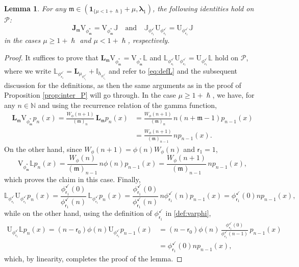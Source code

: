 \documentclass[JEP,XML,SOM,Unicode]{cedram}
\theoremstyle{plain}
\newtheorem{lemma}[theorem]{Lemma}
\theoremstyle{definition}
\newcommand{\N}{\mathbb{N}}
\newcommand{\Poly}{\mathscr{P}}
\newcommand{\calI}{\mathds{I}}
\newcommand{\calL}{\mathds{L}}
\newcommand{\calLd}{\mathbf{L}}
\newcommand{\calJ}{\mathds{J}}
\newcommand{\calJd}{\mathbf{J}}
\newcommand{\m}{\mathfrak{m}}
\newcommand{\lam}{{\bm{\lambda}_1}}
\newcommand{\tet}{{\mathsf{r}_0}}
\newcommand{\vat}{{\mathsf{r}_1}}
\newcommand{\phm}{{\phi_\m^*}}
\renewcommand{\varphi}{{\phi_{\vat}^{\checkmark}}}
\let\h\hslash
\let\mo\mu
\begin{document}
\begin{lemma}
\label{prop:inter_P-2}
For any $\m \in (\bm{1}_{\{\mo < 1+\h\}}+\mo,\lam)$, the following identities hold on $\Poly$:
\begin{equation*}%
\calJd_\m {\mathrm{V}}_{\phm} = \mathrm{V}_{\phm}\calJ \quad \text{and} \quad \calJ_\varphi \mathrm{U}_\varphi = \mathrm{U}_\varphi \calJ
\end{equation*}
in the cases $\mo \geq 1+\h$ and $\mo < 1+\h$, respectively.
\end{lemma}

\begin{proof}
It suffices to prove that $\calLd_\m {\mathrm{V}}_{\phm} = {\mathrm{V}}_{\phm} \calL$ and $\calL_\varphi \mathrm{U}_\varphi = \mathrm{U}_\varphi \calL$ hold on $\Poly$, where we write $\calL_\varphi = \calLd_{\mo_\varphi} +\calI_{h_\varphi}$ and refer to \eqref{eq:defL} and the subsequent discussion for the definitions, as then the same arguments as in the proof of Proposition \ref{prop:inter_P} will go through. In the case $\mo \geq 1+\h$, we have, for any $n\in \N$ and using the recurrence relation of the gamma function,
\begin{align*}
\calLd_\m {\mathrm{V}}_{\phm}p_n(x) = \frac{W_{\phi}(n+1)}{(\m)_n}\,\calLd_\m p_n(x) &= \frac{W_{\phi}(n+1)}{(\m)_n}\,n(n+\m-1) p_{n-1}(x)\\
& = \frac{W_{\phi}(n+1)}{(\m)_{n-1}}\, n p_{n-1}(x).
\end{align*}
On the other hand, since $W_\phi(n+1)=\phi(n)W_\phi(n)$ and $\vat = 1$,
\begin{equation*}
{\mathrm{V}}_{\phm}\calL p_n(x) = \frac{W_{\phi}(n)}{(\m)_{n-1}}\, n\phi(n) p_{n-1}(x)
= \frac{W_{\phi}(n+1)}{(\m)_{n-1}}\, n p_{n-1}(x),
\end{equation*}
which proves the claim in this case. Finally,
\begin{equation*}
\calL_\varphi \mathrm{U}_\varphi p_n(x) = \frac{\varphi(0)}{\varphi(n)}\, \calL_\varphi p_n(x)= \frac{\varphi(0)}{\varphi(n)}\, n\varphi(n) p_{n-1}(x) = \varphi(0)np_{n-1}(x),
\end{equation*}
while on the other hand, using the definition of $\varphi$ in \eqref{def:varphi},
\begin{align*}
\mathrm{U}_\varphi \calL p_n(x) = (n-\tet)\phi(n) \mathrm{U}_\varphi	p_{n-1}(x) &= (n-\tet)\phi(n)\, \frac{\varphi(0)}{\varphi(n-1)}\, p_{n-1}(x)\\
&= \varphi(0) np_{n-1}(x),
\end{align*}
which, by linearity, completes the proof of the lemma.
\end{proof}
\end{document}
